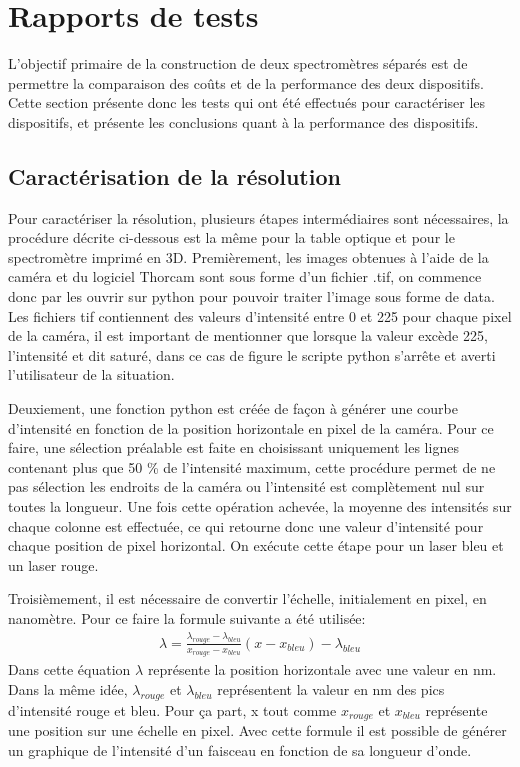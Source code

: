 \documentclass[11pt,letterpaper]{article}
\begin{document}
\section{Rapports de tests}

L'objectif primaire de la construction de deux spectromètres séparés est de permettre la 
comparaison des coûts et de la performance des deux dispositifs. Cette section présente
donc les tests qui ont été effectués pour caractériser les dispositifs, et présente les 
conclusions quant à la performance des dispositifs.

\subsection{Caractérisation de la résolution}

Pour caractériser la résolution, plusieurs étapes intermédiaires sont nécessaires, la procédure décrite ci-dessous est la même 
pour la table optique et pour le spectromètre imprimé en 3D. 
Premièrement, les images obtenues à l'aide de la caméra et du logiciel Thorcam sont sous forme d'un fichier .tif,
on commence donc par les ouvrir sur python pour pouvoir traiter l'image sous forme de data. Les fichiers tif 
contiennent des valeurs d'intensité entre 0 et 225 pour chaque pixel de la caméra, il est important de mentionner
que lorsque la valeur excède 225, l'intensité et dit saturé, dans ce cas de figure le scripte python s'arrête et 
averti l'utilisateur de la situation. 

Deuxiement, une fonction python est créée de façon à générer une courbe d'intensité en fonction de la position horizontale 
en pixel de la caméra. Pour ce faire, une sélection préalable est faite en choisissant uniquement les lignes 
contenant plus que 50 \% de l'intensité maximum, cette procédure permet de ne pas sélection les endroits de la caméra 
ou l'intensité est complètement nul sur toutes la longueur. Une fois cette opération achevée, la moyenne des intensités sur chaque
colonne est effectuée, ce qui retourne donc une valeur d'intensité pour chaque position de pixel horizontal. On exécute cette étape pour 
un laser bleu et un laser rouge.

Troisièmement, il est nécessaire de convertir l'échelle, initialement en pixel, en nanomètre.
Pour ce faire la formule suivante a été utilisée: 
\begin{align}\label{GratingEq}
  \lambda =\frac{\lambda _{rouge}-\lambda _{bleu}}{x_{rouge}-x_{bleu}}(x-x_{bleu})-\lambda _{bleu}
\end{align}
Dans cette équation $\lambda $ représente la position horizontale avec une valeur en nm. Dans la même idée, 
$\lambda _{rouge}$ et $\lambda _{bleu}$ représentent la valeur en nm des pics d'intensité rouge et bleu. 
Pour ça part, x tout comme $x_{rouge}$ et $x_{bleu}$ représente une position sur une échelle en pixel.
Avec cette formule il est possible de générer un graphique de l'intensité d'un faisceau en fonction 
de sa longueur d'onde. 
\end{document}
